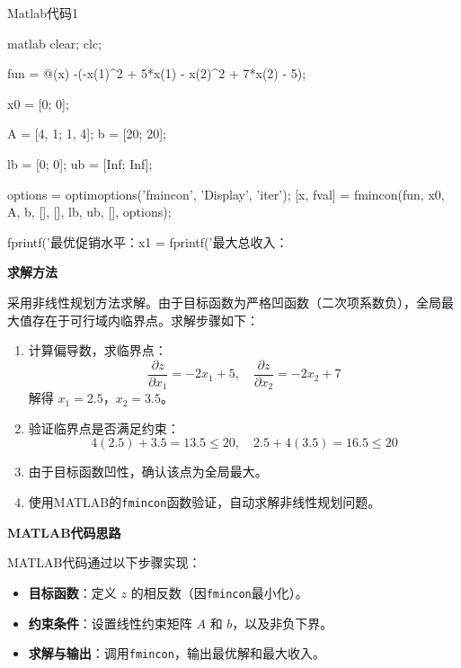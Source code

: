 \begin{codebox}{Matlab代码}{1}
    \begin{amzcode}{matlab}
        clear; clc;

        fun = @(x) -(-x(1)^2 + 5*x(1) - x(2)^2 + 7*x(2) - 5); %

        x0 = [0; 0];

        A = [4, 1; 1, 4];
        b = [20; 20];

        lb = [0; 0];
        ub = [Inf; Inf];

        options = optimoptions('fmincon', 'Display', 'iter');
        [x, fval] = fmincon(fun, x0, A, b, [], [], lb, ub, [], options);

        fprintf('最优促销水平：x1 = %
        fprintf('最大总收入：%
    \end{amzcode}
\end{codebox}

\textbf{求解方法}

采用非线性规划方法求解。由于目标函数为严格凹函数（二次项系数负），全局最大值存在于可行域内临界点。求解步骤如下：
\begin{enumerate}
    \item 计算偏导数，求临界点：
    \[
    \frac{\partial z}{\partial x_1} = -2x_1 + 5, \quad \frac{\partial z}{\partial x_2} = -2x_2 + 7
    \]
    解得 $x_1 = 2.5$，$x_2 = 3.5$。
    \item 验证临界点是否满足约束：
    \[
    4(2.5) + 3.5 = 13.5 \leq 20, \quad 2.5 + 4(3.5) = 16.5 \leq 20
    \]
    \item 由于目标函数凹性，确认该点为全局最大。
    \item 使用MATLAB的\texttt{fmincon}函数验证，自动求解非线性规划问题。
\end{enumerate}

\textbf{MATLAB代码思路}

MATLAB代码通过以下步骤实现：
\begin{itemize}
    \item \textbf{目标函数}：定义 $z$ 的相反数（因\texttt{fmincon}最小化）。
    \item \textbf{约束条件}：设置线性约束矩阵 $A$ 和 $b$，以及非负下界。
    \item \textbf{求解与输出}：调用\texttt{fmincon}，输出最优解和最大收入。
\end{itemize}

